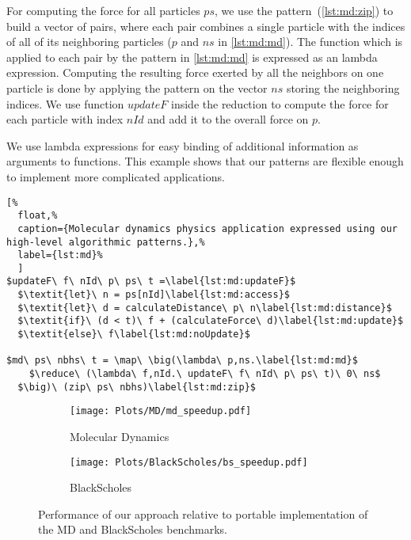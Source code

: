 For computing the force for all particles $ps$, we use the \zip pattern~(\autoref{lst:md:zip}) to build a vector of pairs, where each pair combines a single particle with the indices of all of its neighboring particles ($p$ and $ns$ in \autoref{lst:md:md}).
The function which is applied to each pair by the \map pattern in \autoref{lst:md:md} is expressed as an lambda expression.
Computing the resulting force exerted by all the neighbors on one particle is done by applying the \reduce pattern on the vector $ns$ storing the neighboring indices.
We use function $updateF$ inside the reduction to compute the force for each particle with index $nId$ and add it to the overall force on $p$.

We use lambda expressions for easy binding of additional information as arguments to functions.
This example shows that our patterns are flexible enough to implement more complicated applications.


\begin{lstlisting}[%
  float,%
  caption={Molecular dynamics physics application expressed using our high-level algorithmic patterns.},%
  label={lst:md}%
  ]
$updateF\ f\ nId\ p\ ps\ t =\label{lst:md:updateF}$
  $\textit{let}\ n = ps[nId]\label{lst:md:access}$
  $\textit{let}\ d = calculateDistance\ p\ n\label{lst:md:distance}$
  $\textit{if}\ (d < t)\ f + (calculateForce\ d)\label{lst:md:update}$
  $\textit{else}\ f\label{lst:md:noUpdate}$

$md\ ps\ nbhs\ t = \map\ \big(\lambda\ p,ns.\label{lst:md:md}$
    $\reduce\ (\lambda\ f,nId.\ updateF\ f\ nId\ p\ ps\ t)\ 0\ ns$
  $\big)\ (zip\ ps\ nbhs)\label{lst:md:zip}$
\end{lstlisting}

\begin{figure}[t]
  \centering
  \begin{subfigure}[b]{0.48\linewidth}
    \texttt{[image: Plots/MD/md\_speedup.pdf]}
    \caption{Molecular Dynamics}
    \label{fig:md:results}
  \end{subfigure}
  \hfill
  \begin{subfigure}[b]{0.48\linewidth}
    \texttt{[image: Plots/BlackScholes/bs\_speedup.pdf]}
    \caption{BlackScholes}
    \label{fig:blackScholes:results}
  \end{subfigure}
  \caption{Performance of our approach relative to portable \OpenCL implementation of the MD and BlackScholes benchmarks.}
   \label{fig:bs:ms:results}
\end{figure}

